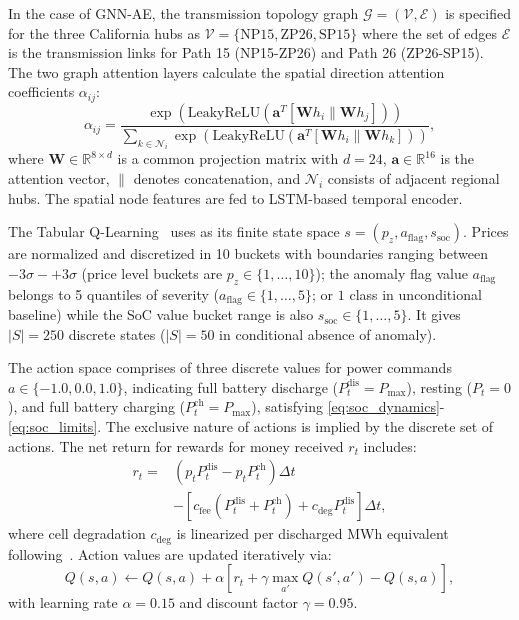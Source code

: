 \documentclass[journal]{IEEEtran}
\begin{document}
In the case of GNN-AE, the transmission topology graph $\mathcal{G} = (\mathcal{V}, \mathcal{E})$ is specified for the three California hubs as $\mathcal{V} = \{\text{NP15}, \text{ZP26}, \text{SP15}\}$ where the set of edges $\mathcal{E}$ is the transmission links for Path 15 (NP15-ZP26) and Path 26 (ZP26-SP15). The two graph attention layers calculate the spatial direction attention coefficients $\alpha_{ij}$:
\begin{equation}
\alpha_{ij} = \frac{\exp\left(\text{LeakyReLU}\left(\mathbf{a}^T [\mathbf{W} h_i \parallel \mathbf{W} h_j]\right)\right)}{\sum_{k \in \mathcal{N}_i} \exp\left(\text{LeakyReLU}\left(\mathbf{a}^T [\mathbf{W} h_i \parallel \mathbf{W} h_k]\right)\right)},
\label{eq:gat}
\end{equation}
where $\mathbf{W} \in \mathbb{R}^{8 \times d}$ is a common projection matrix with $d=24$, $\mathbf{a} \in \mathbb{R}^{16}$ is the attention vector, $\parallel$ denotes concatenation, and $\mathcal{N}_i$ consists of adjacent regional hubs. The spatial node features are fed to LSTM-based temporal encoder.

The Tabular Q-Learning~\cite{Sutton_RL} uses as its finite state space $s = (p_z, a_{\text{flag}}, s_{\text{soc}})$. Prices are normalized and discretized in 10 buckets with boundaries ranging between $-3\sigma - +3\sigma$ (price level buckets are $p_z \in \{1, \dots, 10\}$); the anomaly flag value $a_{\text{flag}}$ belongs to 5 quantiles of severity ($a_{\text{flag}} \in \{1, \dots, 5\}$; or $1$ class in unconditional baseline) while the SoC value bucket range is also $s_{\text{soc}} \in \{1, \dots, 5\}$. It gives $|S|=250$ discrete states ($|S|=50$ in conditional absence of anomaly).

The action space comprises of three discrete values for power commands $a \in \{-1.0, 0.0, 1.0\}$, indicating full battery discharge ($P_t^{\text{dis}}=P_{\max}$), resting ($P_t=0$), and full battery charging ($P_t^{\text{ch}}=P_{\max}$), satisfying \eqref{eq:soc_dynamics}-\eqref{eq:soc_limits}. The exclusive nature of actions is implied by the discrete set of actions. The net return for rewards for money received $r_t$ includes:
\begin{align}
r_t ={}& \left( p_t P_t^{\text{dis}} - p_t P_t^{\text{ch}} \right) \Delta t \nonumber \\
&- \left[ c_{\text{fee}} \left( P_t^{\text{dis}} + P_t^{\text{ch}} \right) + c_{\text{deg}} P_t^{\text{dis}} \right] \Delta t,
\label{eq:reward}
\end{align}
where cell degradation $c_{\text{deg}}$ is linearized per discharged MWh equivalent following~\cite{Xu_BESS_Degradation}. Action values are updated iteratively via:
\begin{equation}
Q(s,a) \leftarrow Q(s,a) + \alpha \left[r_t + \gamma \max_{a'} Q(s',a') - Q(s,a)\right],
\label{eq:qlearning}
\end{equation}
with learning rate $\alpha=0.15$ and discount factor $\gamma=0.95$.
\end{document}

